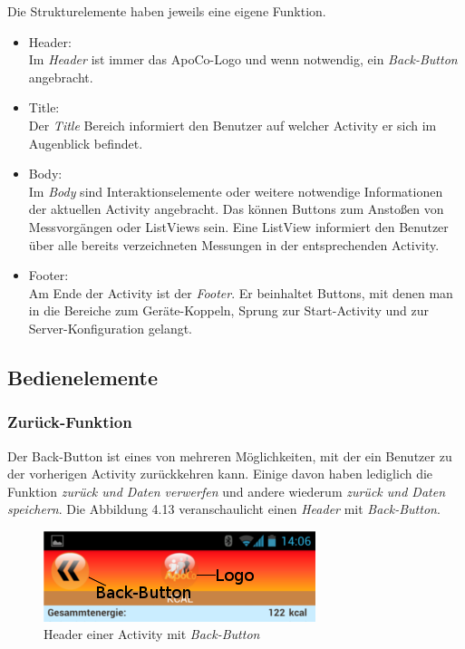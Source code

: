 Die Strukturelemente haben jeweils eine eigene Funktion.
\begin{itemize}
 \item Header:\\
 Im \emph{Header} ist immer das ApoCo-Logo und wenn notwendig, ein \emph{Back-Button} angebracht.

 \item Title:\\
 Der \emph{Title} Bereich informiert den Benutzer auf welcher Activity er sich im Augenblick befindet.
 \item Body:\\
 Im \emph{Body} sind Interaktionselemente oder weitere notwendige Informationen der aktuellen Activity angebracht.
 Das k\"onnen Buttons zum Ansto\ss{}en von Messvorg\"angen oder ListViews sein.
 Eine ListView informiert den Benutzer \"uber alle bereits verzeichneten Messungen in der entsprechenden Activity.
 \item Footer:\\
 Am Ende der Activity ist der \emph{Footer}.
 Er beinhaltet Buttons, mit denen man in die Bereiche zum Ger\"ate-Koppeln, Sprung zur Start-Activity und zur 
 Server-Konfiguration gelangt. 
\end{itemize}


\subsection{Bedienelemente}

\subsubsection{Zur\"uck-Funktion}

Der Back-Button ist eines von mehreren M\"oglichkeiten, mit der ein Benutzer zu der vorherigen Activity zur\"uckkehren kann.
Einige davon haben lediglich die Funktion \emph{zur\"uck und Daten verwerfen} und andere wiederum 
\emph{zur\"uck und Daten speichern}.
Die Abbildung 4.13 veranschaulicht einen \emph{Header} mit \emph{Back-Button}.\\

\begin{figure}[h]
  \centering
  \includegraphics[scale=0.5]{screenshots/kapitel4/gui/header_backbtn.png}
  \caption{Header einer Activity mit \emph{Back-Button}}
  
\end{figure}

